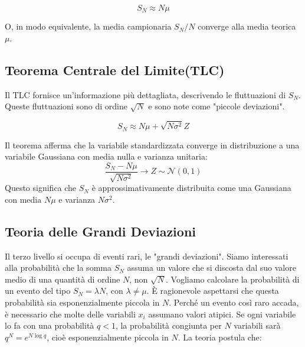 \begin{tcolorbox}[colback=yellow!30,  
                  colframe=yellow!50!orange,  
                  boxrule=0.8pt, 
                  arc=3pt,  
                  top=4pt, bottom=4pt, left=6pt, right=6pt,
                  enhanced,
                  sharp corners=south]
\begin{equation}
 S_N \approx N\mu
\end{equation}
\end{tcolorbox}


O, in modo equivalente, la media campionaria $S_N/N$ converge alla media teorica $\mu$.

\subsection{Teorema  Centrale del Limite(TLC)}
Il TLC fornisce un'informazione più dettagliata, descrivendo le fluttuazioni di $S_N$. Queste fluttuazioni sono di ordine $\sqrt{N}$ e sono note come "piccole deviazioni". 

\begin{tcolorbox}[colback=yellow!30,  
                  colframe=yellow!50!orange,  
                  boxrule=0.8pt, 
                  arc=3pt,  
                  top=4pt, bottom=4pt, left=6pt, right=6pt,
                  enhanced,
                  sharp corners=south]
\begin{equation}
 S_N \approx N\mu + \sqrt{N \sigma^2} Z
\end{equation}
\end{tcolorbox}

Il teorema afferma che la variabile standardizzata converge in distribuzione a una variabile Gaussiana con media nulla e varianza unitaria:
\begin{equation}
 \frac{S_N - N\mu}{\sqrt{N\sigma^2}} \rightarrow Z \sim \mathcal{N}(0,1)
\end{equation}
Questo significa che $S_N$ è approssimativamente distribuita come una Gaussiana con media $N\mu$ e varianza $N\sigma^2$.

\subsection{Teoria delle Grandi Deviazioni}
Il terzo livello si occupa di eventi rari, le "grandi deviazioni". Siamo interessati alla probabilità che la somma $S_N$ assuma un valore che si discosta dal suo valore medio di una quantità di ordine $N$, non $\sqrt{N}$. Vogliamo calcolare la probabilità di un evento del tipo $S_N = \lambda N$, con $\lambda \neq \mu$.
È ragionevole aspettarsi che questa probabilità sia esponenzialmente piccola in $N$. Perché un evento così raro accada, è necessario che molte delle variabili $x_i$ assumano valori atipici. Se ogni variabile lo fa con una probabilità $q<1$, la probabilità congiunta per $N$ variabili sarà $q^N = e^{N\log q}$, cioè esponenzialmente piccola in $N$.
La teoria postula che:

